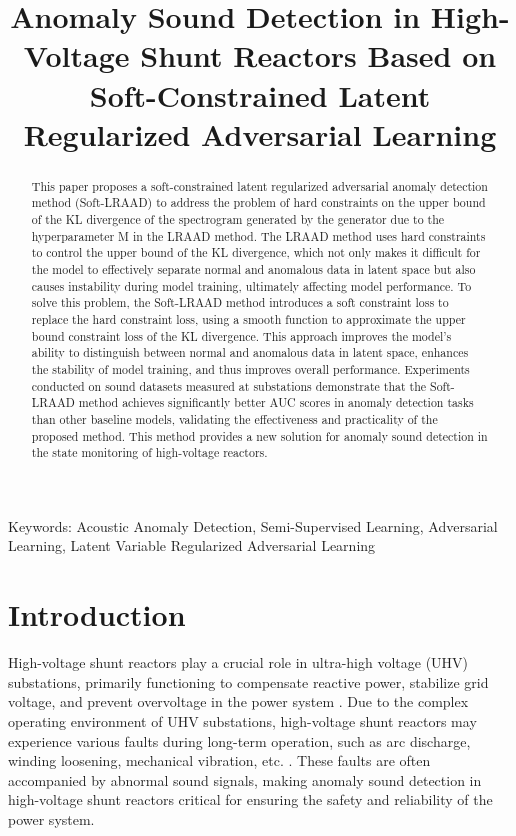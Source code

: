 \documentclass{article}
\title{Anomaly Sound Detection in High-Voltage Shunt Reactors Based on Soft-Constrained Latent Regularized Adversarial Learning}
\begin{document}
\maketitle

\begin{abstract}
  This paper proposes a soft-constrained latent regularized adversarial anomaly detection method (Soft-LRAAD) to address the problem of hard constraints on the upper bound of the KL divergence of the spectrogram generated by the generator due to the hyperparameter M in the LRAAD method. The LRAAD method uses hard constraints to control the upper bound of the KL divergence, which not only makes it difficult for the model to effectively separate normal and anomalous data in latent space but also causes instability during model training, ultimately affecting model performance.
  To solve this problem, the Soft-LRAAD method introduces a soft constraint loss to replace the hard constraint loss, using a smooth function to approximate the upper bound constraint loss of the KL divergence. This approach improves the model's ability to distinguish between normal and anomalous data in latent space, enhances the stability of model training, and thus improves overall performance.
  Experiments conducted on sound datasets measured at substations demonstrate that the Soft-LRAAD method achieves significantly better AUC scores in anomaly detection tasks than other baseline models, validating the effectiveness and practicality of the proposed method. This method provides a new solution for anomaly sound detection in the state monitoring of high-voltage reactors.
\end{abstract}

Keywords: Acoustic Anomaly Detection, Semi-Supervised Learning, Adversarial Learning, Latent Variable Regularized Adversarial Learning

\section{Introduction}

High-voltage shunt reactors play a crucial role in ultra-high voltage (UHV) substations, primarily functioning to compensate reactive power, stabilize grid voltage, and prevent overvoltage in the power system \cite{das2017novel, magdaleno2014temperature, tumay2017review}. Due to the complex operating environment of UHV substations, high-voltage shunt reactors may experience various faults during long-term operation, such as arc discharge, winding loosening, mechanical vibration, etc. \cite{yao2015noninvasive, velasquez2019root}. These faults are often accompanied by abnormal sound signals, making anomaly sound detection in high-voltage shunt reactors critical for ensuring the safety and reliability of the power system.
\end{document}
